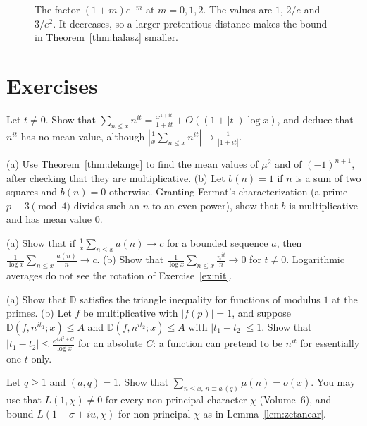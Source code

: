 \begin{figure}[ht]
\centering
{}
\caption{The factor $(1+m)e^{-m}$ at $m=0,1,2$. The values are $1$, $2/e$ and $3/e^2$. It decreases, so a larger pretentious distance makes the bound in Theorem~\ref{thm:halasz} smaller.}
\label{fig:v14-extra-10-b}
\end{figure}

\section{Exercises}

\begin{exercise}[$\star$]\label{ex:nit}
Let $t\ne0$. Show that $\sum_{n\le x}n^{it}=\frac{x^{1+it}}{1+it}+O((1+|t|)\log x)$, and deduce that $n^{it}$ has no mean value, although $|\frac1x\sum_{n\le x}n^{it}|\to\frac1{|1+it|}$.
\end{exercise}

\begin{exercise}[$\star$]\label{ex:means}
(a) Use Theorem~\ref{thm:delange} to find the mean values of $\mu^2$ and of $(-1)^{n+1}$, after checking that they are multiplicative.
(b) Let $b(n)=1$ if $n$ is a sum of two squares and $b(n)=0$ otherwise. Granting Fermat's characterization (a prime $p\equiv3\pmod4$ divides such an $n$ to an even power), show that $b$ is multiplicative and has mean value $0$.
\end{exercise}

\begin{exercise}[$\star\star$]\label{ex:logmean}
(a) Show that if $\frac1x\sum_{n\le x}a(n)\to c$ for a bounded sequence $a$, then $\frac1{\log x}\sum_{n\le x}\frac{a(n)}n\to c$.
(b) Show that $\frac1{\log x}\sum_{n\le x}\frac{n^{it}}n\to0$ for $t\ne0$. Logarithmic averages do not see the rotation of Exercise~\ref{ex:nit}.
\end{exercise}

\begin{exercise}[$\star\star$]\label{ex:repulsion}
(a) Show that $\mathbb D$ satisfies the triangle inequality for functions of modulus $1$ at the primes.
(b) Let $f$ be multiplicative with $|f(p)|=1$, and suppose $\mathbb D(f,n^{it_1};x)\le A$ and $\mathbb D(f,n^{it_2};x)\le A$ with $|t_1-t_2|\le1$. Show that $|t_1-t_2|\le\frac{e^{4A^2+C}}{\log x}$ for an absolute $C$: a function can pretend to be $n^{it}$ for essentially one $t$ only.
\end{exercise}

\begin{exercise}[$\star\star\star$]\label{ex:mobiusap}
Let $q\ge1$ and $(a,q)=1$. Show that $\sum_{n\le x,\,n\equiv a\,(q)}\mu(n)=o(x)$. You may use that $L(1,\chi)\ne0$ for every non-principal character $\chi$ (Volume~6), and bound $L(1+\sigma+iu,\chi)$ for non-principal $\chi$ as in Lemma~\ref{lem:zetanear}.
\end{exercise}

